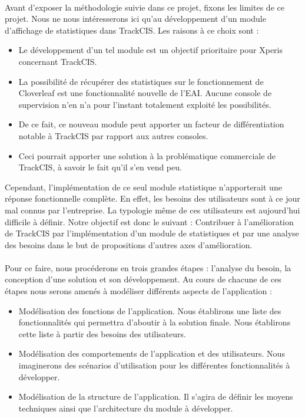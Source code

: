 			\paragraph{}%
			Avant d'exposer la méthodologie suivie dans ce projet, fixons les limites de
			ce projet. Nous ne nous intéresserons ici qu'au développement d'un
			module d'affichage de statistiques dans TrackCIS. Les raisons à ce choix sont
			:
			\begin{itemize}
			  \item Le développement d'un tel module est un objectif prioritaire pour
			  Xperis concernant TrackCIS.
			  \item La possibilité de récupérer des statistiques sur le fonctionnement de
			  Cloverleaf est une fonctionnalité nouvelle de l'EAI. Aucune console de
			  supervision n'en n'a pour l'instant totalement exploité les possibilités.
			  \item De ce fait, ce nouveau module peut apporter un facteur de
			  différentiation notable à TrackCIS par rapport aux autres consoles.
			  \item Ceci pourrait apporter une solution à la problématique commerciale
			  de TrackCIS, à savoir le fait qu'il s'en vend peu.
			\end{itemize}
			Cependant, l'implémentation de ce seul module statistique n'apporterait une
			réponse fonctionnelle complète. En effet, les besoins des utilisateurs sont à
			ce jour mal connus par l'entreprise. La typologie même de ces utilisateurs
			est aujourd'hui difficile à définir.\newline
			Notre objectif est donc le suivant :\newline
			Contribuer à l'amélioration de TrackCIS par l'implémentation d'un module de
			statistiques et par une analyse des besoins dans le but de propositions
			d'autres axes d'amélioration.

			\paragraph{}%
			Pour ce faire, nous procéderons en trois grandes étapes : l'analyse du
			besoin, la conception d'une solution et son développement. Au cours de
			chacune de ces étapes nous serons amenés à modéliser différents aspects de
			l'application :
			\begin{itemize}
			  \item Modélisation des fonctions de l'application. Nous établirons une
			  liste des fonctionnalités qui permettra d'aboutir à la solution finale.
			  Nous établirons cette liste à partir des besoins des utilisateurs.
			  \item Modélisation des comportements de l'application et des utilisateurs.
			  Nous imaginerons des scénarios d'utilisation pour les différentes
			  fonctionnalités à développer.
			  \item Modélisation de la structure de l'application. Il s'agira de définir
			  les moyens techniques ainsi que l'architecture du module à développer.
			\end{itemize}
			
